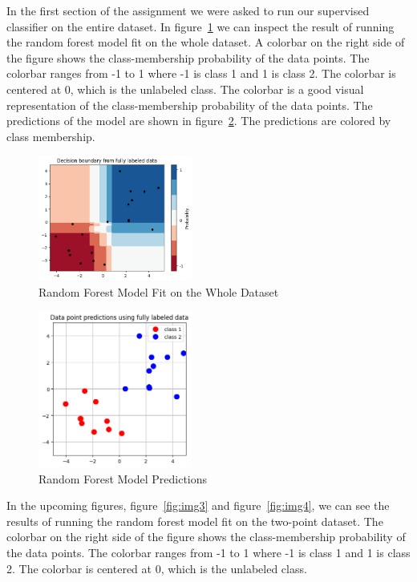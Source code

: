 In the first section of the assignment we were asked to run our supervised classifier on the entire dataset. In figure~\ref{fig:img1} we can inspect the result of running the random forest model fit on the whole dataset.
A colorbar on the right side of the figure shows the class-membership probability of the data points. The colorbar ranges from -1 to 1 where -1 is class 1 and 1 is class 2. The colorbar is centered at 0, which is the unlabeled class. 
The colorbar is a good visual representation of the class-membership probability of the data points. The predictions of the model are shown in figure~\ref{fig:img2}. The predictions are colored by class membership.

\begin{figure}[H]
    \centering
    \includegraphics[width=0.45\textwidth]{images/img1.png}
    \caption{Random Forest Model Fit on the Whole Dataset}
    \label{fig:img1}
\end{figure}

\begin{figure}[H]
    \centering
    \includegraphics[width=0.45\textwidth]{images/img2.png}
    \caption{Random Forest Model Predictions}
    \label{fig:img2}
\end{figure}

In the upcoming figures, figure~\ref{fig:img3} and figure~\ref{fig:img4}, we can see the results of running the random forest model fit on the two-point dataset.
The colorbar on the right side of the figure shows the class-membership probability of the data points. The colorbar ranges from -1 to 1 where -1 is class 1 and 1 is class 2. The colorbar is centered at 0, which is the unlabeled class.

